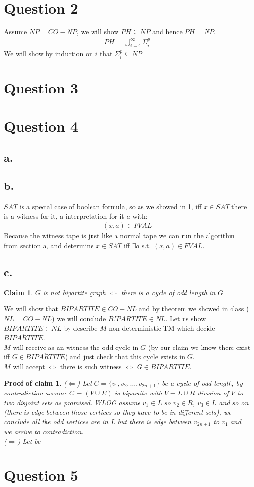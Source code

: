 \documentclass[11pt]{article}
\theoremstyle{plain}
\newtheorem{claim}{Claim}[theorem]
\theoremstyle{nonumberplainnobrackets}
\newtheorem{claimproof}{Proof of claim}
\begin{document}
\section*{Question 2}
Assume $NP=CO-NP$, we will show $PH\subseteq NP$ and hence $PH=NP$.\\
\begin{align*}
PH = \bigcup_{i=0}^\infty \Sigma_i^p
\end{align*}
We will show by induction on $i$ that $\Sigma_i^p\subseteq NP$

\section*{Question 3}

\section*{Question 4}
\subsection*{a. }
\subsection*{b. } $SAT$ is a special case of boolean formula, so as we showed in 1, iff $x\in SAT$ there is a witness for it, a interpretation for it $a$ with:  
\begin{align*}
(x,a)\in FVAL
\end{align*}
Because the witness tape is just like a normal tape we can run the algorithm from section a, and determine $x\in SAT$ iff $\exists a$ s.t. $ (x,a)\in FVAL$. 
\subsection*{c. }
\begin{claim}
$G$ is not bipartite graph $\iff$ there is a cycle of odd length in $G$
\end{claim}
We will show that $BIPARTITE \in CO-NL$ and by theorem we showed in class ($NL=CO-NL$) we will conclude $BIPARTITE\in NL$. Let us show $\overline{BIPARTITE}\in NL$ by describe $M$ non deterministic TM which decide $\overline{BIPARTITE}$.\\
$M$ will receive as an witness the odd cycle in $G$ (by our claim we know there exist iff $G\in \overline{BIPARTITE}$) and just check that this cycle exists in $G$.\\
$M$ will accept $\iff$ there is such witness $\iff$ $G \in \overline{BIPARTITE}$.
\begin{claimproof}
($\Leftarrow$) Let $C = \{ v_1,v_2,\ldots,v_{2n+1} \}$ be a cycle of odd length, by contradiction assume $G=(V\cup E)$ is bipartite with $V=L\cup R$ division of $V$ to two disjoint sets as promised. WLOG assume $v_1\in L$ so $v_2\in R$, $v_3\in L$ and so on (there is edge between those vertices so they have to be in different sets), we conclude all the odd vertices are in $L$ but there is edge between $v_{2n+1}$ to $v_1$ and we arrive to contradiction.\\
($\Rightarrow$) Let be 
\end{claimproof}	
\section*{Question 5}
\end{document}
